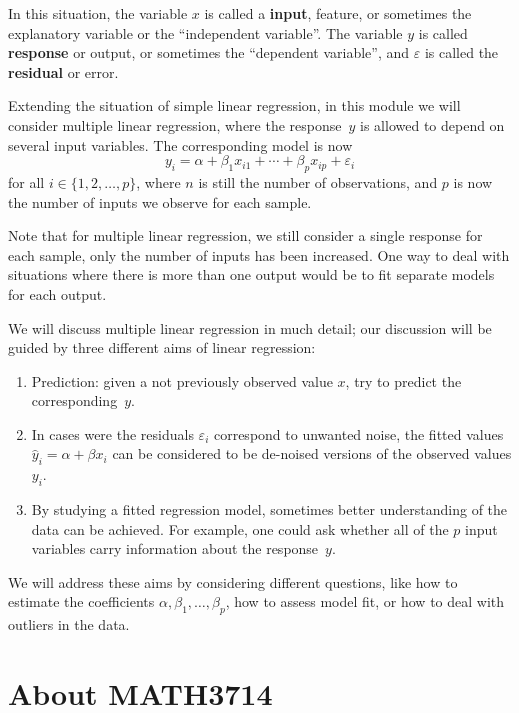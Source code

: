 \documentclass[
  a4paper,
]{article}
\providecommand{\tightlist}{%
  \setlength{\itemsep}{0pt}\setlength{\parskip}{0pt}}
\theoremstyle{definition}
\theoremstyle{definition}
\theoremstyle{definition}
\theoremstyle{definition}
\theoremstyle{remark}
\begin{document}
In this situation, the variable \(x\) is called a \textbf{input}, feature, or
sometimes the explanatory variable or the ``independent variable''.
The variable \(y\) is called \textbf{response} or output, or sometimes the
``dependent variable'', and \(\varepsilon\) is called the \textbf{residual} or error.

Extending the situation of simple linear regression, in this module
we will consider multiple linear regression, where the response~\(y\)
is allowed to depend on several input variables. The corresponding
model is now
\begin{equation*}
  y_i = \alpha + \beta_1 x_{i1} + \cdots + \beta_p x_{ip} + \varepsilon_i
\end{equation*}
for all \(i \in \{1, 2, \ldots, p\}\), where \(n\) is still the number
of observations, and \(p\) is now the number of inputs we observe for
each sample.

Note that for multiple linear regression, we still consider a
single response for each sample, only the number of inputs has been
increased. One way to deal with situations where there is more than
one output would be to fit separate models for each output.

We will discuss multiple linear regression in much detail; our discussion
will be guided by three different aims of linear regression:

\begin{enumerate}
\def\labelenumi{\arabic{enumi}.}
\tightlist
\item
  Prediction: given a not previously observed value \(x\), try to predict
  the corresponding~\(y\).
\item
  In cases were the residuals \(\varepsilon_i\) correspond to unwanted noise,
  the fitted values \(\hat y_i = \alpha + \beta x_i\) can be considered
  to be de-noised versions of the observed values \(y_i\).
\item
  By studying a fitted regression model, sometimes better understanding
  of the data can be achieved. For example, one could ask whether
  all of the \(p\) input variables carry information about the response~\(y\).
\end{enumerate}

We will address these aims by considering different questions, like
how to estimate the coefficients \(\alpha, \beta_1, \ldots, \beta_p\),
how to assess model fit, or how to deal with outliers in the data.

\clearpage

\hypertarget{S00-about}{%
\section*{About MATH3714}\label{S00-about}}
\end{document}
